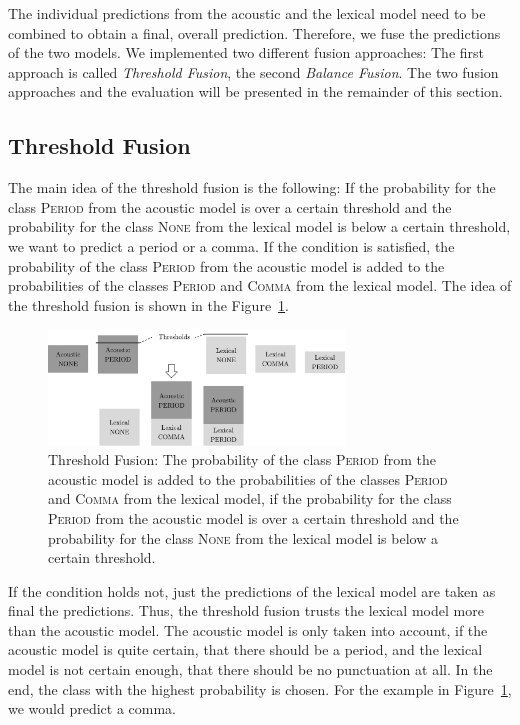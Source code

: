 The individual predictions from the acoustic and the lexical model need to be combined to obtain a final, overall prediction.
Therefore, we fuse the predictions of the two models.
We implemented two different fusion approaches: 
The first approach is called \emph{Threshold Fusion}, the second \emph{Balance Fusion}.
The two fusion approaches and the evaluation will be presented in the remainder of this section.

\subsection{Threshold Fusion}
The main idea of the threshold fusion is the following: If the probability for the class \textsc{Period} from the acoustic model is over a certain threshold and the probability for the class \textsc{None} from the lexical model is below a certain threshold, we want to predict a period or a comma.
If the condition is satisfied, the probability of the class \textsc{Period} from the acoustic model is added to the probabilities of the classes \textsc{Period} and \textsc{Comma} from the lexical model.
The idea of the threshold fusion is shown in the Figure~\ref{fig:fusion_1}.
\begin{figure}[ht]
    \centering
    \includegraphics[width=0.7\textwidth]{img/fusion_1.pdf}
    \caption{Threshold Fusion: The probability of the class \textsc{Period} from the acoustic model is added to the probabilities of the classes \textsc{Period} and \textsc{Comma} from the lexical model, if the probability for the class \textsc{Period} from the acoustic model is over a certain threshold and the probability for the class \textsc{None} from the lexical model is below a certain threshold.}
    \label{fig:fusion_1}
\end{figure}
If the condition holds not, just the predictions of the lexical model are taken as final the predictions.
Thus, the threshold fusion trusts the lexical model more than the acoustic model.
The acoustic model is only taken into account, if the acoustic model is quite certain, that there should be a period, and the lexical model is not certain enough, that there should be no punctuation at all.
In the end, the class with the highest probability is chosen.
For the example in Figure~\ref{fig:fusion_1}, we would predict a comma. 

